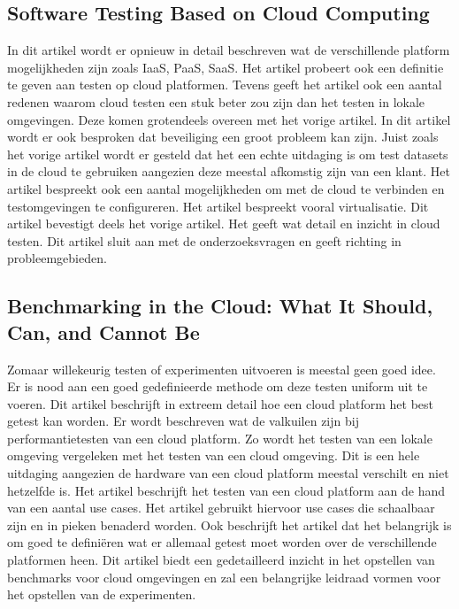 \subsection{Software Testing Based on Cloud Computing}
In dit artikel \autocite{STBOCC}wordt er opnieuw in detail beschreven wat de verschillende platform mogelijkheden zijn zoals IaaS, PaaS, SaaS. Het artikel probeert ook een definitie te geven aan testen op cloud platformen. Tevens geeft het artikel ook een aantal redenen waarom cloud testen een stuk beter zou zijn dan het testen in lokale omgevingen. Deze komen grotendeels overeen met het vorige artikel. In dit artikel wordt er ook besproken dat beveiliging een groot probleem kan zijn. Juist zoals het vorige artikel wordt er gesteld dat het een echte uitdaging is om test datasets in de cloud te gebruiken aangezien deze meestal afkomstig zijn van een klant. Het artikel bespreekt ook een aantal mogelijkheden om met de cloud te verbinden en testomgevingen te configureren. Het artikel bespreekt vooral virtualisatie.
\newline
\newline
Dit artikel bevestigt deels het vorige artikel. Het geeft wat detail en inzicht in cloud testen. Dit artikel sluit aan met de onderzoeksvragen en geeft richting in probleemgebieden.

\subsection{Benchmarking in the Cloud: What It Should, Can, and Cannot Be}
Zomaar willekeurig testen of experimenten uitvoeren is meestal geen goed idee. Er is nood aan een goed gedefinieerde methode om deze testen uniform uit te voeren. Dit artikel \autocite{BITCWISCACB} beschrijft in extreem detail hoe een cloud platform het best getest kan worden. Er wordt beschreven wat de valkuilen zijn bij performantietesten van een cloud platform. Zo wordt het testen van een lokale omgeving vergeleken met het testen van een cloud omgeving. Dit is een hele uitdaging aangezien de hardware van een cloud platform meestal verschilt en niet hetzelfde is. Het artikel beschrijft het testen van een cloud platform aan de hand van een aantal use cases. Het artikel gebruikt hiervoor use cases die schaalbaar zijn en in pieken benaderd worden. Ook beschrijft het artikel dat het belangrijk is om goed te definiëren wat er allemaal getest moet worden over de verschillende platformen heen.
\newline
\newline
Dit artikel biedt een gedetailleerd inzicht in het opstellen van benchmarks voor cloud omgevingen en zal een belangrijke leidraad vormen voor het opstellen van de experimenten.

